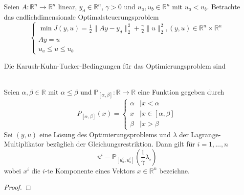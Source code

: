 
Seien $A: \mathbb R^n\to \mathbb R^n$ linear, $y_d\in\mathbb R^n$, $\gamma>0$ und $u_a,u_b\in\mathbb R^n$ mit $u_a<u_b$. Betrachte das endlichdimensionale Optimalsteuerungsproblem
$$\begin{cases}\min J(y,u)=\frac{1}{2}\|Ay-y_d\|_2^2+\frac{\gamma}{2}\|u\|_2^2, (y,u)\in\mathbb R^n\times \mathbb R^n\\Ay=u\\u_a\leq u\leq u_b\end{cases}$$
\begin{compactenum}[(i)]
\item Die Karush-Kuhn-Tucker-Bedingungen für das Optimierungsproblem sind\\\\
\item Seien $\alpha,\beta\in\mathbb R$ mit $\alpha\leq\beta$ und $\mathbb P_{[\alpha,\beta]}:\mathbb R\to\mathbb R$ eine Funktion gegeben durch $$P_{[\alpha,\beta]}(x)=\begin{cases}\alpha&\mid x<\alpha\\x&\mid x\in[\alpha,\beta]\\\beta&\mid x>\beta\end{cases}$$
Sei $(\overline y,\overline u)$ eine Lösung des Optimierungsproblems und $\lambda$ der Lagrange-Multiplikator bezüglich der Gleichungsrestriktion. Dann gilt für $i=1,...,n$
$$\overline u^i = \mathbb P_{[u_a^i,u_b^i]}(\frac{1}{\gamma}\lambda_i)$$
wobei $x^i$ die $i$-te Komponente eines Vektors $x\in\mathbb R^n$ bezeichne. 
\begin{proof}
\end{proof}
\end{compactenum}
